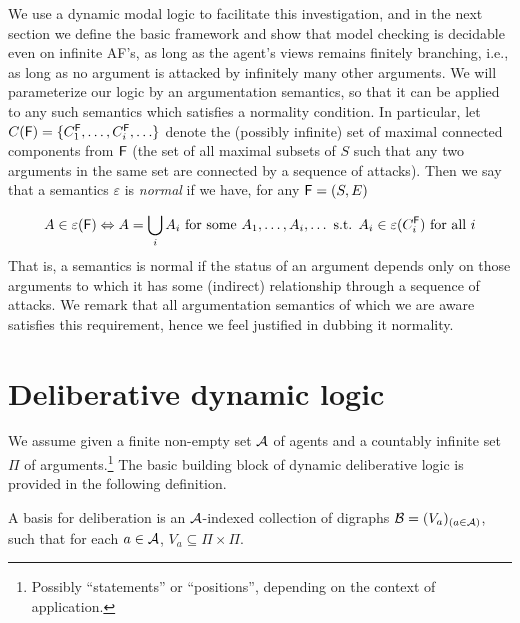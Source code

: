 \documentclass{llncs}
\newcommand{\af}{{\sf F}}
\newcommand{\basis}{basis }
\newcommand{\views}{\mathcal B}
\newcommand{\sem}{\varepsilon}
\begin{document}
We use a dynamic modal logic to facilitate this investigation, and in the next section we define the basic framework and show that model checking is decidable even on infinite AF's, as long as the agent's views remains finitely branching, i.e., as long as no argument is attacked by infinitely many other arguments. We will parameterize our logic by an argumentation semantics, so that it can be applied to any such semantics which satisfies a normality condition. In particular, let $C(\af) = \{C^{\af}_1,\ldots,C^{\af}_i,\ldots\}$ denote the (possibly infinite) set of maximal connected components from $\af$ (the set of all maximal subsets of $S$ such that any two arguments in the same set are connected by a sequence of attacks). Then we say that a semantics $\sem$ is \emph{normal} if we have, for any $\af = (S,E)$

\begin{equation}\label{eq:normal}
A \in \sem(\af) \Leftrightarrow A = \bigcup_{i}A_i \text{ for some } A_1,\ldots,A_i,\ldots \text{ s.t. } A_i \in \sem(C^{\af}_i) \text { for all } i
\end{equation}
That is, a semantics is normal if the status of an argument depends only on those arguments to which it has some (indirect) relationship through a sequence of attacks. We remark that all argumentation semantics of which we are aware satisfies this requirement, hence we feel justified in dubbing it normality.


\section{Deliberative dynamic logic}\label{sec:ddl}

We assume given a finite non-empty set $\mathcal A$ of agents and a countably infinite set $\Pi$ of arguments.\footnote{Possibly ``statements'' or ``positions'', depending on the context of application.} The basic building block of dynamic deliberative logic is provided in the following definition.

\begin{definition}\label{def:basis} A \basis for deliberation is an $\mathcal A$-indexed collection of digraphs $\views = (V_a)_{(a \in \agents)}$, such that for each $a \in \mathcal A$, $V_a \subseteq \Pi \times \Pi$.
\end{definition}
\end{document}
